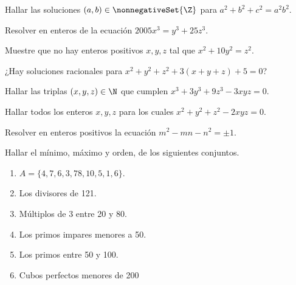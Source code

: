 \begin{exercise}
    Hallar las soluciones $(a,b) \in \nonnegativeSet{\Z}$ para $a^2 + b^2 + c^2 = a^2 b^2$.
\end{exercise}

\begin{exercise}
    Resolver en enteros de la ecuación $2005x^3 = y^3 + 25z^3$.
\end{exercise}

\begin{exercise}
    Muestre que no hay enteros positivos $x,y,z$ tal que $x^2 + 10y^2 = z^2$.
\end{exercise}

\begin{problem}
    ¿Hay soluciones racionales para $x^2+ y^2 + z^2 + 3(x+y+z) + 5 = 0$?
\end{problem}

\begin{problem}
    Hallar las triplas $(x,y,z) \in \N$ que cumplen $x^3 + 3y^3 + 9z^3 - 3xyz = 0$.
\end{problem}

\begin{problem}
    Hallar todos los enteros $x,y,z$ para los cuales $x^2 + y^2 + z^2 - 2xyz = 0$.
\end{problem}

\begin{problem}
    Resolver en enteros positivos la ecuación $m^2 - mn - n^2 = \pm 1.$
\end{problem}

\begin{exercise}
    Hallar el mínimo, máximo y orden, de los siguientes conjuntos.
    \begin{multicols}{2}
        \begin{enumerate}
            \item $A = \{4,7,6,3,78,10,5, 1,6\}$.
            \item Los divisores de 121.
            \item Múltiplos de 3 entre 20 y 80.
            \item Los primos impares menores a 50.
            \item Los primos entre 50 y 100.
            \item Cubos perfectos menores de 200
        \end{enumerate}
    \end{multicols}
\end{exercise}












